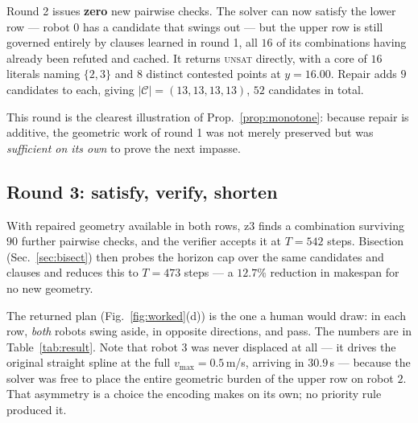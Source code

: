 \documentclass[conference]{IEEEtran}
\newcommand{\Cand}{\mathcal{C}}
\begin{document}
Round 2 issues \textbf{zero} new pairwise checks. The solver can now satisfy the lower row
--- robot $0$ has a candidate that swings out --- but the upper row is still governed
entirely by clauses learned in round 1, all $16$ of its combinations having already been
refuted and cached. It returns \textsc{unsat} directly, with a core of $16$ literals naming
$\{2,3\}$ and $8$ distinct contested points at $y = 16.00$. Repair adds $9$ candidates to
each, giving $|\Cand| = (13,13,13,13)$, $52$ candidates in total.

This round is the clearest illustration of Prop.~\ref{prop:monotone}: because repair is
additive, the geometric work of round 1 was not merely preserved but was \emph{sufficient on
its own} to prove the next impasse.

\subsection{Round 3: satisfy, verify, shorten}

With repaired geometry available in both rows, z3 finds a combination surviving $90$
further pairwise checks, and the verifier accepts it at $T = 542$ steps. Bisection
(Sec.~\ref{sec:bisect}) then probes the horizon cap over the same candidates and clauses and
reduces this to $T = 473$ steps --- a $12.7\%$ reduction in makespan for no new geometry.

The returned plan (Fig.~\ref{fig:worked}(d)) is the one a human would draw: in each row,
\emph{both} robots swing aside, in opposite directions, and pass. The numbers are in
Table~\ref{tab:result}. Note that robot $3$ was never displaced at all --- it drives the
original straight spline at the full $v_{\max} = 0.5$\,m/s, arriving in $30.9$\,s --- because
the solver was free to place the entire geometric burden of the upper row on robot $2$. That
asymmetry is a choice the encoding makes on its own; no priority rule produced it.
\end{document}
